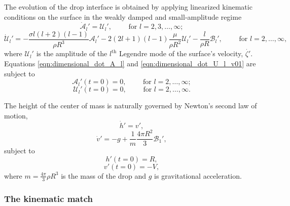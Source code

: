 \documentclass{jfm}
\begin{document}
The evolution of the drop interface is obtained by applying linearized kinematic conditions on the surface in the weakly damped and small-amplitude regime \citep{Lamb1924,miller1968oscillations,Phillips_Milewski_2024}
\begin{equation}\label{eqn:dimensional_dot_A_l}
    \dot{\mathscr{A}}_l' = \mathscr{U}_l', \qquad \text{ for } l = 2,3,\ldots, \infty;
\end{equation}
\begin{equation}\label{eqn:dimensional_dot_U_l_v01}
    \dot{\mathscr{U}}_l'
    =
    -\frac{\sigma l \left(l+2\right)\left(l-1\right)}{\rho R^3}\mathscr{A}_l'
    -2(2l+1)(l-1)\frac{\mu}{\rho R^2}\mathscr{U}_l'
    -\frac{l}{\rho R}\mathscr{B}_l', \qquad \text{ for } l = 2,\ldots,\infty,
\end{equation}
where $\mathscr{U}_l'$ is the amplitude of the $l^\text{th}$ Legendre mode of the surface's velocity, $\dot{\zeta'}$. Equations \eqref{eqn:dimensional_dot_A_l} and \eqref{eqn:dimensional_dot_U_l_v01} are subject to 
\begin{equation}
    \mathscr{A}_l'(t=0) = 0, \qquad \text{ for } l = 2,\ldots,\infty;
\end{equation}
\begin{equation}
    \mathscr{U}_l'(t=0) = 0, \qquad \text{ for } l = 2,\ldots,\infty.
\end{equation}

The height of the center of mass is naturally governed by Newton's second law of motion,
\begin{equation}
    \dot{h}' = v',
\end{equation}
\begin{equation}
    \dot{v}' = -g + \frac{1}{m}\frac{4\pi R^2}{3}\mathscr{B}_1',
\end{equation}
subject to
\begin{equation}
    h'(t=0) = R,
\end{equation}
\begin{equation}
    v'(t=0) = -V,
\end{equation} where $m=\frac{4\pi}{3}\rho R^3$ is the mass of the drop and $g$ is gravitational acceleration.


\subsubsection{The kinematic match} \label{subsubsec:thekinematicmatch}
\end{document}
